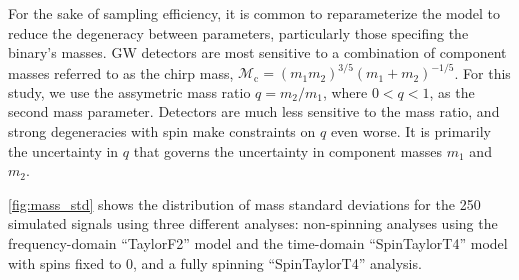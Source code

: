 For the sake of sampling efficiency, it is common to reparameterize the model to reduce the degeneracy between parameters, particularly those specifing the binary's masses.  GW detectors are most sensitive to a combination of component masses referred to as the chirp mass, $\mathcal{M}_\mathrm{c} = (m_1 m_2)^{3/5} (m_1 + m_2)^{-1/5}$.  For this study, we use the assymetric mass ratio $q = m_2/m_1$, where $0 < q < 1$, as the second mass parameter.  Detectors are much less sensitive to the mass ratio, and strong degeneracies with spin make constraints on $q$ even worse.  It is primarily the uncertainty in $q$ that governs the uncertainty in component masses $m_1$ and $m_2$.

\ref{fig:mass_std} shows the distribution of mass standard deviations for the 250 simulated signals using three different analyses: non-spinning analyses using the frequency-domain ``TaylorF2'' model and the time-domain ``SpinTaylorT4'' model with spins fixed to 0, and a fully spinning ``SpinTaylorT4'' analysis.